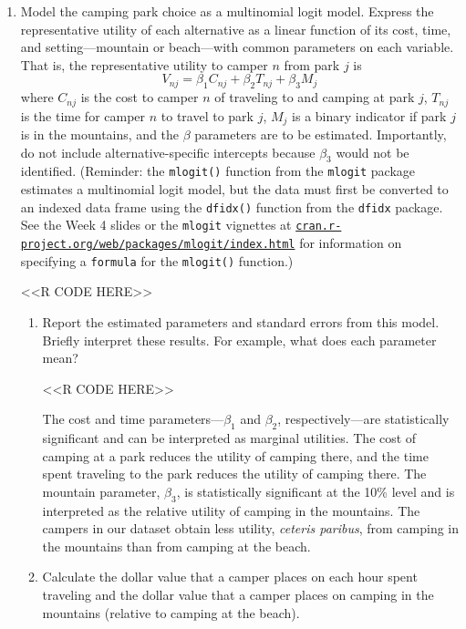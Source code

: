 \documentclass[11pt,letterpaper]{article}
\begin{document}
\begin{enumerate}[label=\alph*., leftmargin=*]
	\item Model the camping park choice as a multinomial logit model. Express the representative utility of each alternative as a linear function of its cost, time, and setting---mountain or beach---with common parameters on each variable. That is, the representative utility to camper $n$ from park $j$ is
	$$V_{nj} = \beta_1 C_{nj} + \beta_2 T_{nj} + \beta_3 M_j$$
	where $C_{nj}$ is the cost to camper $n$ of traveling to and camping at park $j$, $T_{nj}$ is the time for camper $n$ to travel to park $j$, $M_j$ is a binary indicator if park $j$ is in the mountains, and the $\beta$ parameters are to be estimated. Importantly, do not include alternative-specific intercepts because $\beta_3$ would not be identified. (Reminder: the \texttt{mlogit()} function from the \texttt{mlogit} package estimates a multinomial logit model, but the data must first be converted to an indexed data frame using the \texttt{dfidx()} function from the \texttt{dfidx} package. See the Week 4 slides or the \texttt{mlogit} vignettes at \href{https://cran.r-project.org/web/packages/mlogit/index.html}{\texttt{cran.r-project.org/web/packages/mlogit/index.html}} for information on specifying a \texttt{formula} for the \texttt{mlogit()} function.)

	<<R CODE HERE>>

	\begin{enumerate}[label=\roman*.]
		\item Report the estimated parameters and standard errors from this model. Briefly interpret these results. For example, what does each parameter mean?

		<<R CODE HERE>>

		The cost and time parameters---$\beta_1$ and $\beta_2$, respectively---are statistically significant and can be interpreted as marginal utilities. The cost of camping at a park reduces the utility of camping there, and the time spent traveling to the park reduces the utility of camping there. The mountain parameter, $\beta_3$, is statistically significant at the 10\% level and is interpreted as the relative utility of camping in the mountains. The campers in our dataset obtain less utility, \emph{ceteris paribus}, from camping in the mountains than from camping at the beach.

		\item Calculate the dollar value that a camper places on each hour spent traveling and the dollar value that a camper places on camping in the mountains (relative to camping at the beach).


\end{enumerate}
\end{enumerate}
\end{document}
